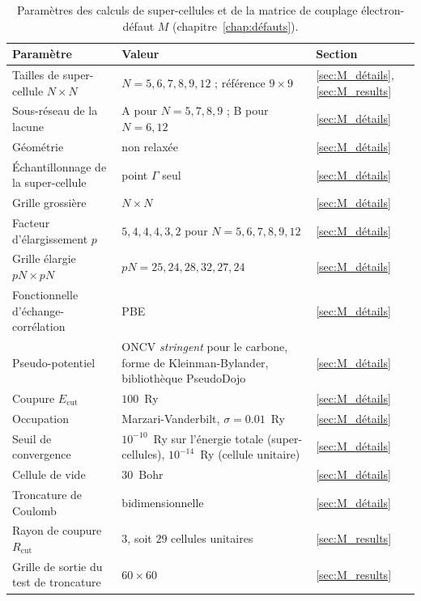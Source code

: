 \begin{table}[htbp]
    \centering
    \caption[Paramètres des super-cellules et de la matrice $M$.]{Paramètres des calculs de super-cellules et de la matrice de couplage électron-défaut $M$ (chapitre~\ref{chap:défauts}).}
    \label{tab:param_M}
    \small
    \setlength{\tabcolsep}{4pt}
    \begin{tabular}{p{} p{} p{}}
        \hline\hline
        Paramètre & Valeur & Section \\
        \hline
        Tailles de super-cellule $N\times N$ & $N = 5, 6, 7, 8, 9, 12$ ; référence $9\times 9$ & \ref{sec:M_détails}, \ref{sec:M_results} \\
        Sous-réseau de la lacune & A pour $N = 5, 7, 8, 9$ ; B pour $N = 6, 12$ & \ref{sec:M_détails} \\
        Géométrie & non relaxée & \ref{sec:M_détails} \\
        Échantillonnage de la super-cellule & point $\Gamma$ seul & \ref{sec:M_détails} \\
        Grille grossière & $N\times N$ & \ref{sec:M_détails} \\
        Facteur d'élargissement $p$ & $5, 4, 4, 4, 3, 2$ pour $N = 5, 6, 7, 8, 9, 12$ & \ref{sec:M_détails} \\
        Grille élargie $pN\times pN$ & $pN = 25, 24, 28, 32, 27, 24$ & \ref{sec:M_détails} \\
        Fonctionnelle d'échange-corrélation & PBE & \ref{sec:M_détails} \\
        Pseudo-potentiel & ONCV \textit{stringent} pour le carbone, forme de Kleinman-Bylander, bibliothèque PseudoDojo & \ref{sec:M_détails} \\
        Coupure $E_\text{cut}$ & $100$~Ry & \ref{sec:M_détails} \\
        Occupation & Marzari-Vanderbilt, $\sigma = 0.01$~Ry & \ref{sec:M_détails} \\
        Seuil de convergence & $10^{-10}$~Ry sur l'énergie totale (super-cellules), $10^{-14}$~Ry (cellule unitaire) & \ref{sec:M_détails} \\
        Cellule de vide & $30$~Bohr & \ref{sec:M_détails} \\
        Troncature de Coulomb & bidimensionnelle & \ref{sec:M_détails} \\
        Rayon de coupure $R_\text{cut}$ & $3$, soit $29$ cellules unitaires & \ref{sec:M_results} \\
        Grille de sortie du test de troncature & $60\times 60$ & \ref{sec:M_results} \\

\end{tabular}
\end{table}
